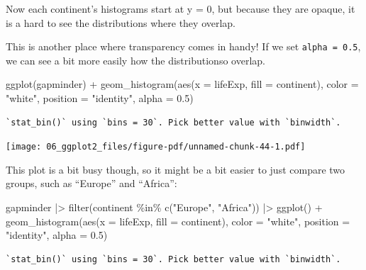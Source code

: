 \documentclass[
  letterpaper,
  DIV=11,
  numbers=noendperiod]{scrreprt}
\newenvironment{Shaded}{\begin{snugshade}}{\end{snugshade}}
\newcommand{\AttributeTok}[1]{\textcolor[rgb]{0.40,0.45,0.13}{#1}}
\newcommand{\FloatTok}[1]{\textcolor[rgb]{0.68,0.00,0.00}{#1}}
\newcommand{\FunctionTok}[1]{\textcolor[rgb]{0.28,0.35,0.67}{#1}}
\newcommand{\NormalTok}[1]{\textcolor[rgb]{0.00,0.23,0.31}{#1}}
\newcommand{\SpecialCharTok}[1]{\textcolor[rgb]{0.37,0.37,0.37}{#1}}
\newcommand{\StringTok}[1]{\textcolor[rgb]{0.13,0.47,0.30}{#1}}
\begin{document}
Now each continent's histograms start at y = 0, but because they are
opaque, it is a hard to see the distributions where they overlap.

This is another place where transparency comes in handy! If we set
\texttt{alpha\ =\ 0.5}, we can see a bit more easily how the
distributionso overlap.

\begin{Shaded}
\begin{Highlighting}[]
\FunctionTok{ggplot}\NormalTok{(gapminder) }\SpecialCharTok{+} 
  \FunctionTok{geom\_histogram}\NormalTok{(}\FunctionTok{aes}\NormalTok{(}\AttributeTok{x =}\NormalTok{ lifeExp, }\AttributeTok{fill =}\NormalTok{ continent), }
                 \AttributeTok{color =} \StringTok{"white"}\NormalTok{,}
                 \AttributeTok{position =} \StringTok{"identity"}\NormalTok{,}
                 \AttributeTok{alpha =} \FloatTok{0.5}\NormalTok{)}
\end{Highlighting}
\end{Shaded}

\begin{verbatim}
`stat_bin()` using `bins = 30`. Pick better value with `binwidth`.
\end{verbatim}

\texttt{[image: 06\_ggplot2\_files/figure-pdf/unnamed-chunk-44-1.pdf]}

This plot is a bit busy though, so it might be a bit easier to just
compare two groups, such as ``Europe'' and ``Africa'':

\begin{Shaded}
\begin{Highlighting}[]
\NormalTok{gapminder }\SpecialCharTok{|\textgreater{}}
  \FunctionTok{filter}\NormalTok{(continent }\SpecialCharTok{\%in\%} \FunctionTok{c}\NormalTok{(}\StringTok{"Europe"}\NormalTok{, }\StringTok{"Africa"}\NormalTok{)) }\SpecialCharTok{|\textgreater{}}
  \FunctionTok{ggplot}\NormalTok{() }\SpecialCharTok{+} 
  \FunctionTok{geom\_histogram}\NormalTok{(}\FunctionTok{aes}\NormalTok{(}\AttributeTok{x =}\NormalTok{ lifeExp, }\AttributeTok{fill =}\NormalTok{ continent), }
                 \AttributeTok{color =} \StringTok{"white"}\NormalTok{,}
                 \AttributeTok{position =} \StringTok{"identity"}\NormalTok{,}
                 \AttributeTok{alpha =} \FloatTok{0.5}\NormalTok{)}
\end{Highlighting}
\end{Shaded}

\begin{verbatim}
`stat_bin()` using `bins = 30`. Pick better value with `binwidth`.
\end{verbatim}
\end{document}
